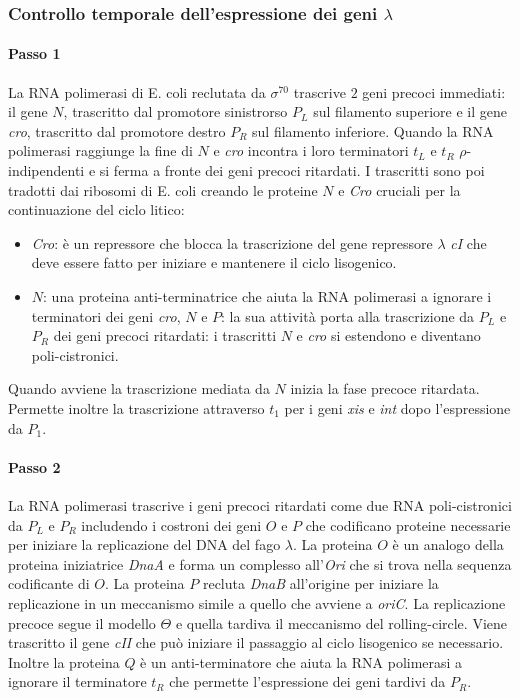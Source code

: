 \subsubsection{Controllo temporale dell'espressione dei geni $\lambda$}
\paragraph{Passo 1}
La RNA polimerasi di E. coli reclutata da $\sigma^{70}$ trascrive $2$ geni precoci immediati: il gene $N$, trascritto dal promotore sinistrorso $P_L$ sul filamento superiore e il gene 
\emph{cro}, trascritto dal promotore destro $P_R$ sul filamento inferiore. Quando la RNA polimerasi raggiunge la fine di $N$ e \emph{cro} incontra i loro terminatori $t_L$ e $t_R$ 
$\rho$-indipendenti e si ferma a fronte dei geni precoci ritardati. I trascritti sono poi tradotti dai ribosomi di E. coli creando le proteine $N$ e \emph{Cro} cruciali per la 
continuazione del ciclo litico:
\begin{itemize}
	\item \emph{Cro}: \`e un repressore che blocca la trascrizione del gene repressore $\lambda$ \emph{cI} che deve essere fatto per iniziare e mantenere il ciclo lisogenico. 
	\item $N$: una proteina anti-terminatrice che aiuta la RNA polimerasi a ignorare i terminatori dei geni \emph{cro}, $N$ e $P$: la sua attivit\`a porta alla trascrizione
		da $P_L$ e $P_R$ dei geni precoci ritardati: i trascritti $N$ e \emph{cro} si estendono e diventano poli-cistronici.
\end{itemize}
Quando avviene la trascrizione mediata da $N$ inizia la fase precoce ritardata. Permette inoltre la trascrizione attraverso $t_1$ per i geni \emph{xis} e \emph{int} dopo l'espressione
da $P_1$. 
\paragraph{Passo 2}
La RNA polimerasi trascrive i geni precoci ritardati come due RNA poli-cistronici da $P_L$ e $P_R$ includendo i costroni dei geni $O$ e $P$ che codificano proteine necessarie per 
iniziare la replicazione del DNA del fago $\lambda$. La proteina $O$ \`e un analogo della proteina iniziatrice \emph{DnaA} e forma un complesso all'\emph{Ori} che si trova nella
sequenza codificante di $O$. La proteina $P$ recluta \emph{DnaB} all'origine per iniziare la replicazione in un meccanismo simile a quello che avviene a \emph{oriC}. La replicazione
precoce segue il modello $\Theta$ e quella tardiva il meccanismo del rolling-circle. Viene trascritto il gene \emph{cII} che pu\`o iniziare il passaggio al ciclo lisogenico se 
necessario. Inoltre la proteina $Q$ \`e un anti-terminatore che aiuta la RNA polimerasi a ignorare il terminatore $t_R$ che permette l'espressione dei geni tardivi da $P_R$. 
